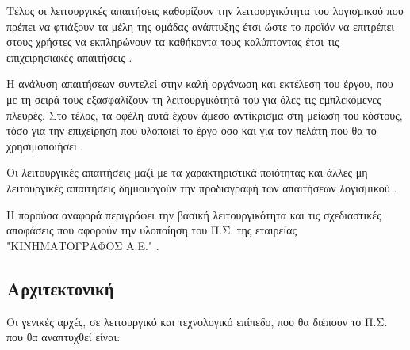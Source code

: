 \documentclass{assignment}
\begin{document}
Τέλος οι λειτουργικές απαιτήσεις καθορίζουν την λειτουργικότητα του λογισμικού που πρέπει να φτιάξουν τα μέλη της ομάδας ανάπτυξης έτσι ώστε το προϊόν να επιτρέπει στους χρήστες να εκπληρώνουν τα καθήκοντα τους καλύπτοντας έτσι τις επιχειρησιακές απαιτήσεις \cite{triadis}.

Η ανάλυση απαιτήσεων συντελεί στην καλή οργάνωση και εκτέλεση του έργου, που με τη σειρά τους εξασφαλίζουν τη λειτουργικότητά του για όλες τις εμπλεκόμενες πλευρές. Στο τέλος, τα οφέλη αυτά έχουν άμεσο αντίκρισμα στη μείωση του κόστους, τόσο για την επιχείρηση που υλοποιεί το έργο όσο και για τον πελάτη που θα το χρησιμοποιήσει \cite{kepa:requirement_analysis}.

Οι λειτουργικές απαιτήσεις μαζί με τα χαρακτηριστικά ποιότητας και άλλες μη λειτουργικές απαιτήσεις δημιουργούν την προδιαγραφή των απαιτήσεων λογισμικού \cite{triadis}. 

Η παρούσα αναφορά περιγράφει την βασική λειτουργικότητα και τις σχεδιαστικές αποφάσεις που αφορούν την υλοποίηση του Π.Σ. της εταιρείας "ΚΙΝΗΜΑΤΟΓΡΑΦΟΣ Α.Ε." .

\subsection{Αρχιτεκτονική}

Οι γενικές αρχές, σε λειτουργικό και τεχνολογικό επίπεδο, που θα διέπουν το Π.Σ. που θα αναπτυχθεί είναι:
\end{document}
